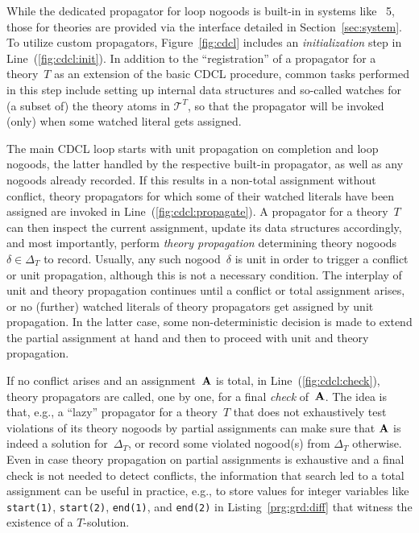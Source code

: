 %
While the dedicated propagator for loop nogoods is built-in in systems like \clingo~5,
those for theories are provided via the interface detailed in Section~\ref{sec:system}.
To utilize custom propagators,
Figure~\ref{fig:cdcl} includes an \emph{initialization} step in Line~(\ref{fig:cdcl:init}).
In addition to the ``registration'' of a propagator for a theory~$T$
as an extension of the basic CDCL procedure,
common   tasks performed in this step include setting up internal data structures and
so-called watches for (a subset of) the theory atoms in $\mathcal{T}^T$,
so that the propagator will be invoked (only) when some watched literal gets assigned.

The main CDCL loop starts with unit propagation on completion and loop nogoods,
the latter handled by the respective built-in propagator, as well as any nogoods
already recorded.
If this results in a non-total assignment without conflict,
theory propagators for which some of their watched literals have been assigned
are invoked in Line~(\ref{fig:cdcl:propagate}).
A propagator for a theory~$T$ can then inspect the current assignment,
update its data structures accordingly, and most importantly,
perform \emph{theory propagation} determining theory nogoods $\delta\in\Delta_T$ to record.
Usually, any such nogood~$\delta$ is unit in order to trigger a conflict or unit propagation,
although this is not a necessary condition.
The interplay of unit and theory propagation continues until a conflict or
total assignment arises,
or no (further) watched literals of theory propagators get assigned by unit propagation.
In the latter case, some non-deterministic decision is made to extend the partial
assignment at hand and then to proceed with unit and theory propagation.

If no conflict arises and an assignment~$\mathbf{A}$ is total,
in Line~(\ref{fig:cdcl:check}), theory propagators are called, one by one,
for a final \emph{check} of~$\mathbf{A}$.
The idea is that, e.g., a ``lazy'' propagator for a theory~$T$
that does not exhaustively test violations of its theory nogoods by partial assignments
can make sure that $\mathbf{A}$ is indeed a solution for~$\Delta_T$, or record some
violated nogood(s) from $\Delta_T$ otherwise.
Even in case theory propagation on partial assignments is exhaustive and a final
check is not needed to detect conflicts,
the information that search led to a total assignment can be useful in practice, e.g.,
to store %
values for integer variables like
\lstinline{start(1)},
\lstinline{start(2)},
\lstinline{end(1)}, and
\lstinline{end(2)} in Listing~\ref{prg:grd:diff}
that witness the existence of a $T$-solution.

